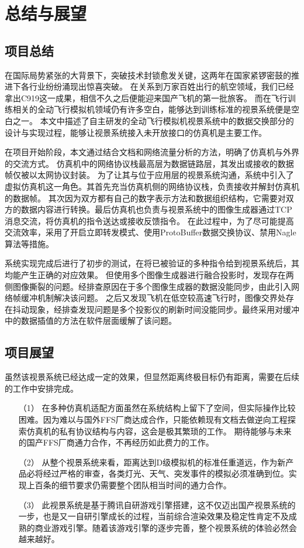\chapter{总结与展望}
\section{项目总结}
在国际局势紧张的大背景下，突破技术封锁愈发关键，这两年在国家紧锣密鼓的推进下各行业纷纷涌现出惊喜突破。
在关系到万家百姓出行的航空领域，我们已经拿出C919这一成果，相信不久之后便能迎来国产飞机的第一批旅客。
而在飞行训练相关的全动飞行模拟机领域仍有许多空白，能够达到训练标准的视景系统便是空白之一。
本文中描述了自主研发的全动飞行模拟机视景系统中的数据交换部分的设计与实现过程，能够让视景系统接入未开放接口的仿真机是主要工作。
\par
在项目开始阶段，本文通过结合文档和网络流量分析的方法，明确了仿真机与外界的交流方式。
仿真机中的网络协议栈最高层为数据链路层，其发出或接收的数据帧仅被以太网协议封装。
为了让其与位于应用层的视景系统沟通，系统中引入了虚拟仿真机这一角色。其首先充当仿真机侧的网络协议栈，负责接收并解封仿真机的数据帧。
其次因为双方都有自己的数字表示方法和数据组织结构，它需要对双方的数据内容进行转换。最后仿真机也负责与视景系统中的图像生成器通过TCP消息交流，将仿真机的指令送达或接收反馈指令。
在此过程中，为了尽可能提高交流效率，采用了开启立即转发模式、使用ProtoBuffer数据交换协议、禁用Nagle算法等措施。
\par
系统实现完成后进行了初步的测试，在将已被验证的多种指令给到视景系统后，其均能产生正确的对应效果。
但使用多个图像生成器进行融合投影时，发现存在两侧图像撕裂的问题。经排查原因在于多个图像生成器的数据没能同步，由此引入网络帧缓冲机制解决该问题。
之后又发现飞机在低空较高速飞行时，图像交界处存在抖动现象，经排查发现问题是多个投影仪的刷新时间没能同步。最终采用对缓冲中的数据插值的方法在软件层面缓解了该问题。
\section{项目展望}
虽然该视景系统已经达成一定的效果，但显然距离终极目标仍有距离，需要在后续的工作中安排完成。
\begin{itemize}
    \item [（1）]
    在多种仿真机适配方面虽然在系统结构上留下了空间，但实际操作比较困难。因为难以与国外FFS厂商达成合作，只能依赖现有文档去做逆向工程探索仿真机的私有协议结构与内容，这会是极其繁琐的工作。
    期待能够与未来的国产FFS厂商通力合作，不再经历如此费力的工作。
    \item [（2）]
    从整个视景系统来看，距离达到D级模拟机的标准任重道远，作为新产品必将经过严格的审查，各类灯光、天气、突发事件的模拟必须准确到位。实现上百条的细节要求仍需要整个团队相当时间的通力合作。
    \item [（3）]
    此视景系统是基于腾讯自研游戏引擎搭建，这不仅迈出国产视景系统的一步，也是又一自研引擎成长的过程，当前综合渲染效果及稳定性肯定不及成熟的商业游戏引擎。随着该游戏引擎的逐步完善，整个视景系统的体验必然会越来越好。
    
\end{itemize}
